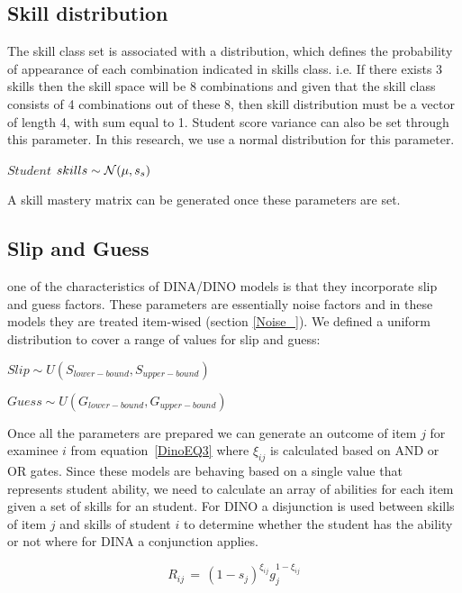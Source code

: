\subsection{Skill distribution}

The skill class set is associated with a distribution, which defines the probability of appearance of each combination indicated in skills class. i.e. If there exists 3 skills then the skill space will be 8 combinations and given that the skill class consists of 4 combinations out of these 8, then skill distribution  must be a vector of length 4, with sum equal to 1. Student score variance can also be set through this parameter. In this research, we use a normal distribution for this parameter.



\begin{center}
$Student$  $skills \sim \mathcal{N}(\mu, s_s)$
\end{center}

A skill mastery matrix can be generated once these parameters are set.


\subsection{Slip and Guess}
one of the characteristics of DINA/DINO models is that they incorporate slip and guess factors. These parameters are essentially noise factors and in these models they are treated item-wised (section \ref{Noise_}). We defined a uniform distribution to cover a range of values for slip and guess:


\begin{center}
$Slip \sim \textit{U}(S_{lower-bound}, S_{upper-bound})$

$Guess \sim \textit{U}(G_{lower-bound}, G_{upper-bound})$
\end{center}

Once all the parameters are prepared we can generate an outcome of item $j$ for examinee $i$ from equation~\ref{DinoEQ3} where $\xi_{ij}$ is calculated based on AND or OR gates. Since these models are behaving based on a single value that represents student ability, we need to calculate an array of abilities for each item given a set of skills for an student. For DINO a disjunction is used between skills of item $j$ and skills of student $i$ to determine whether the student has the ability or not where for DINA a conjunction applies.

\begin{equation}
 R_{ij} \,=\, (1-s_j)^{\xi_{ij}} g_j^{1-\xi_{ij}}
\label{DinoEQ3}
\end{equation}


